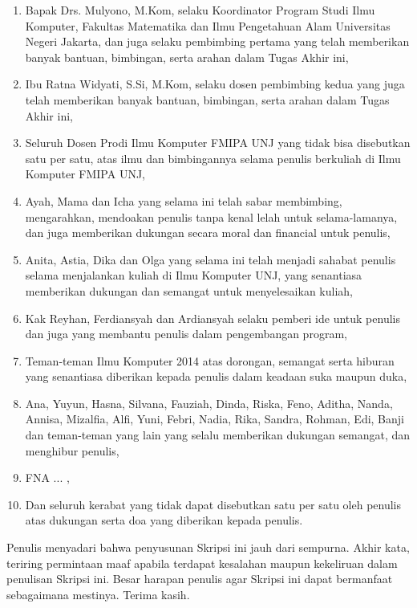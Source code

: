 \documentclass{jtetiskripsi}
\begin{document}
\begin{enumerate}
	\item{Bapak Drs. Mulyono, M.Kom, selaku Koordinator Program Studi Ilmu Komputer, Fakultas Matematika dan Ilmu Pengetahuan Alam Universitas Negeri Jakarta, dan juga selaku pembimbing pertama yang telah memberikan banyak bantuan, bimbingan, serta arahan dalam Tugas Akhir ini,}
	\item{Ibu Ratna Widyati, S.Si, M.Kom, selaku dosen pembimbing kedua yang juga telah memberikan banyak bantuan, bimbingan, serta arahan dalam Tugas Akhir ini,}
	\item{Seluruh Dosen Prodi Ilmu Komputer FMIPA UNJ yang tidak bisa disebutkan satu per satu, atas ilmu dan bimbingannya selama penulis berkuliah di Ilmu Komputer FMIPA UNJ,}
	\item{Ayah, Mama dan Icha yang selama ini telah sabar membimbing, mengarahkan, mendoakan penulis tanpa kenal lelah untuk selama-lamanya, dan juga memberikan dukungan secara moral dan financial untuk penulis,}
	\item{Anita, Astia, Dika dan Olga yang selama ini telah menjadi sahabat penulis selama menjalankan kuliah di Ilmu Komputer UNJ, yang senantiasa memberikan dukungan dan semangat untuk menyelesaikan kuliah,}
	\item{Kak Reyhan, Ferdiansyah dan Ardiansyah selaku pemberi ide untuk penulis dan juga yang membantu penulis dalam pengembangan program,}
	\item{Teman-teman Ilmu Komputer 2014 atas dorongan, semangat serta hiburan yang senantiasa diberikan kepada penulis dalam keadaan suka maupun duka,}
	\item{Ana, Yuyun, Hasna, Silvana, Fauziah, Dinda, Riska, Feno, Aditha, Nanda, Annisa, Mizalfia, Alfi, Yuni, Febri, Nadia, Rika, Sandra, Rohman, Edi, Banji dan teman-teman yang lain yang selalu memberikan dukungan semangat, dan menghibur penulis,}
	\item{FNA ... ,}
	\item{Dan seluruh kerabat yang tidak dapat disebutkan satu per satu oleh penulis atas dukungan serta doa yang diberikan kepada penulis.}
\end{enumerate}

Penulis menyadari bahwa penyusunan Skripsi ini jauh dari sempurna. Akhir kata, teriring permintaan maaf apabila terdapat kesalahan maupun kekeliruan dalam penulisan Skripsi ini. Besar harapan penulis agar Skripsi ini dapat bermanfaat sebagaimana mestinya. Terima kasih.

\vspace{.5cm}
\end{document}
